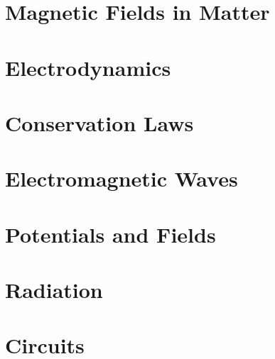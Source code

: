\section{Magnetic Fields in Matter}
\section{Electrodynamics}
\section{Conservation Laws}
\section{Electromagnetic Waves}
\section{Potentials and Fields}
\section{Radiation}
\section{Circuits}

